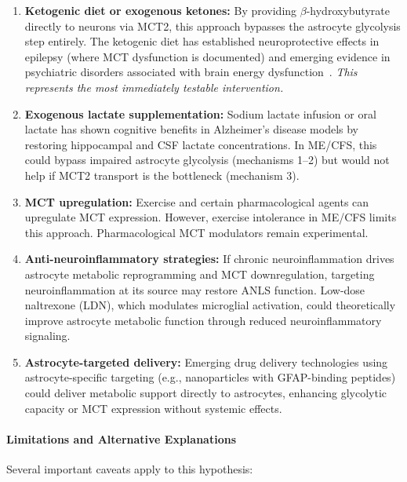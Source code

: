 \begin{enumerate}
    \item \textbf{Ketogenic diet or exogenous ketones:} By providing $\beta$-hydroxybutyrate directly to neurons via MCT2, this approach bypasses the astrocyte glycolysis step entirely. The ketogenic diet has established neuroprotective effects in epilepsy (where MCT dysfunction is documented) and emerging evidence in psychiatric disorders associated with brain energy dysfunction~\cite{Jang2024Ketone}. \emph{This represents the most immediately testable intervention.}

    \item \textbf{Exogenous lactate supplementation:} Sodium lactate infusion or oral lactate has shown cognitive benefits in Alzheimer's disease models by restoring hippocampal and CSF lactate concentrations. In ME/CFS, this could bypass impaired astrocyte glycolysis (mechanisms 1--2) but would not help if MCT2 transport is the bottleneck (mechanism 3).

    \item \textbf{MCT upregulation:} Exercise and certain pharmacological agents can upregulate MCT expression. However, exercise intolerance in ME/CFS limits this approach. Pharmacological MCT modulators remain experimental.

    \item \textbf{Anti-neuroinflammatory strategies:} If chronic neuroinflammation drives astrocyte metabolic reprogramming and MCT downregulation, targeting neuroinflammation at its source may restore ANLS function. Low-dose naltrexone (LDN), which modulates microglial activation, could theoretically improve astrocyte metabolic function through reduced neuroinflammatory signaling.

    \item \textbf{Astrocyte-targeted delivery:} Emerging drug delivery technologies using astrocyte-specific targeting (e.g., nanoparticles with GFAP-binding peptides) could deliver metabolic support directly to astrocytes, enhancing glycolytic capacity or MCT expression without systemic effects.
\end{enumerate}

\paragraph{Limitations and Alternative Explanations}

Several important caveats apply to this hypothesis:

